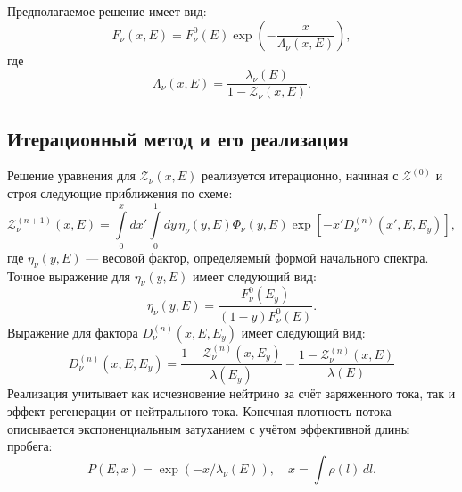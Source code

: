 Предполагаемое решение имеет вид:
\begin{equation}
F_{\nu}(x,E) = F^{0}_{\nu}(E)\exp\left(-\frac{x}{\Lambda_{\nu}(x,E)}\right),
\end{equation}
где 
\begin{equation}
\Lambda_{\nu}(x,E) = \frac{\lambda_{\nu}(E)}{1 - \mathcal{Z}_{\nu}(x,E)}.
\end{equation}

\subsection{Итерационный метод и его реализация}

Решение уравнения для $\mathcal{Z}_{\nu}(x,E)$ реализуется итерационно, начиная с $\mathcal{Z}^{(0)}$ и строя следующие приближения по схеме:
\begin{equation}
\mathcal{Z}^{(n+1)}_{\nu}(x,E) = \int\limits_0^x dx' \int\limits_0^1 dy\,\eta_{\nu}(y,E)\Phi_{\nu}(y,E)\exp\left[ -x'D^{(n)}_{\nu}(x',E,E_y) \right],
\end{equation}
где $\eta_{\nu}(y,E)$ — весовой фактор, определяемый формой начального спектра. Точное выражение для $\eta_{\nu}(y,E)$ имеет следующий вид: 
\begin{equation}
    \eta_{\nu}(y,E) = \frac{F^0_{\nu}(E_y)}{(1-y)F^0_{\nu}(E)}.
\end{equation}
Выражение для фактора $D^{(n)}_{\nu}(x, E, E_y)$ имеет следующий вид:
\begin{equation}
    D^{(n)}_{\nu}(x, E, E_y) = \frac{1-\mathcal{Z}_{\nu}^{(n)}(x, E_y)}{\lambda(E_y)} - \frac{1-\mathcal{Z}_{\nu}^{(n)}(x, E)}{\lambda(E)}
\end{equation}
Реализация учитывает как исчезновение нейтрино за счёт заряженного тока, так и эффект регенерации от нейтрального тока. Конечная плотность потока описывается экспоненциальным затуханием с учётом эффективной длины пробега:
\begin{equation}
P(E,x) = \exp(-x/\lambda_{\nu}(E)), \quad x = \int\rho(l)\,dl.
\end{equation}
